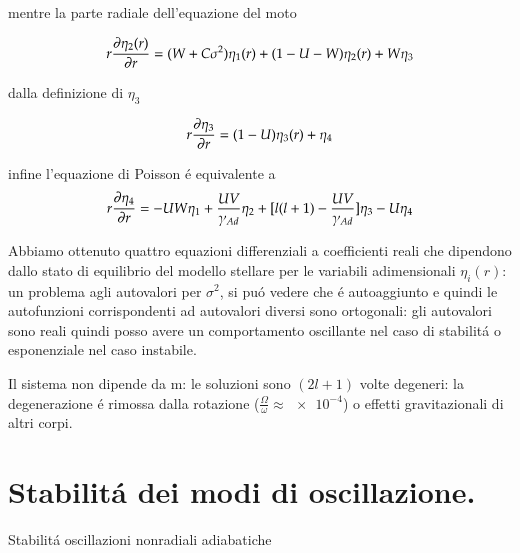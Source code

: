 \documentclass[../main.tex]{subfiles}
\begin{document}
mentre la parte radiale dell'equazione del moto

\begin{equation*}
r\PDy{r}{\eta_2(r)}=(W+C\sigma^2)\eta_1(r)+(1-U-W)\eta_2(r)+W\eta_3
\end{equation*}

dalla definizione di $\eta_3$

\begin{equation*}
r\PDy{r}{\eta_3}=(1-U)\eta_3(r)+\eta_4
\end{equation*}

infine l'equazione di Poisson \'e equivalente a
\begin{equation*}
r\PDy{r}{\eta_4}=-UW\eta_1+\frac{UV}{\gamma_{Ad}}\eta_2+[l(l+1)-\frac{UV}{\gamma_{Ad}}]\eta_3-U\eta_4
\end{equation*}



Abbiamo ottenuto quattro equazioni differenziali a coefficienti reali che dipendono dallo stato di equilibrio del modello stellare per le variabili adimensionali $\eta_i(r)$: un problema agli autovalori per $\sigma^2$, si pu\'o vedere che \'e autoaggiunto e quindi le autofunzioni corrispondenti ad autovalori diversi sono ortogonali: gli autovalori sono reali quindi posso avere un comportamento oscillante nel caso di stabilit\'a o esponenziale nel caso instabile.

Il sistema non dipende da m: le soluzioni sono $(2l+1)$ volte degeneri: la degenerazione \'e rimossa dalla rotazione ($\frac{\Omega}{\omega}\approx\num{e-4}$) o effetti gravitazionali di altri corpi.


\section{Stabilit\'a dei modi di oscillazione.}

\begin{todo}{Stabilit\'a oscillazioni nonradiali adiabatiche}

\end{todo}
\end{document}
